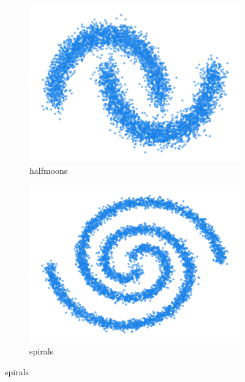 \vspace{10pt}
\begin{figure}[H]
    \centering
    \begin{subfigure}[b]{0.4\textwidth} 
        \centering
        \includegraphics[width=\textwidth]{figures/halfmoons.png}
        \caption{halfmoons}
    \end{subfigure}
    \hfill
    \begin{subfigure}[b]{0.4\textwidth} 
        \centering
        \includegraphics[width=\textwidth]{figures/spirals.png} 
        \caption{spirals}
    \end{subfigure}
    

\end{figure}
